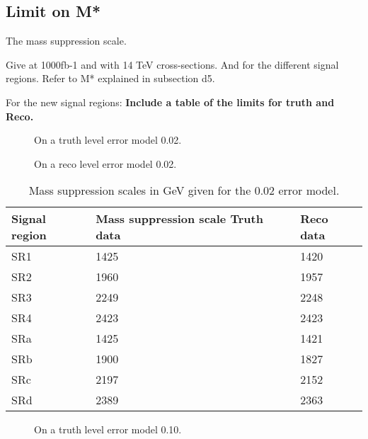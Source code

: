 \subsection{Limit on M*}
The mass suppression scale.

Give at 1000fb-1 and with 14 TeV cross-sections. And for the different signal regions.
Refer to M* explained in subsection d5. 

For the new signal regions: \textbf{Include a table of the limits for truth and Reco.}
 \begin{figure}[H] %
    \hfill
    \caption{On a truth level error model 0.02.}
    \label{fig:SRnewMt}
  \end{figure}

 \begin{figure}[H] %
    \hfill
    \caption{On a reco level error model 0.02.}
    \label{fig:SRnewMr}
  \end{figure}


\begin{table}[ht]
\begin{center}
\begin{tabular}{|l|l|l|}
\hline
Signal region & Mass suppression scale Truth data & Reco data \\ \hline
SR1&1425&1420\\
SR2&1960&1957\\
SR3&2249&2248\\
SR4&2423&2423\\ \hline
SRa&1425&1421\\
SRb&1900&1827\\
SRc&2197&2152\\
SRd&2389&2363\\ \hline
\end{tabular}
\caption{Mass suppression scales in GeV given for the 0.02 error model.}
\label{tab:masssupp002}
\end{center}
\end{table}

 \begin{figure}[H] %
    \hfill
    \caption{On a truth level error model 0.10.}
    \label{fig:SRnewM2t}
  \end{figure}

